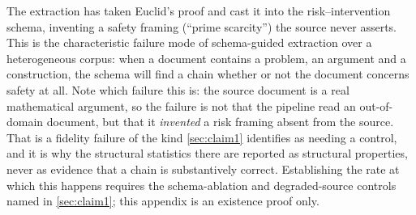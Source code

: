 \documentclass[10pt,twocolumn,letterpaper]{article}
\begin{document}
The extraction has taken Euclid's proof and cast it into the risk--intervention
schema, inventing a safety framing (``prime scarcity'') the source never asserts.
This is the characteristic failure mode of schema-guided extraction over a
heterogeneous corpus: when a document contains a problem, an argument and a
construction, the schema will find a chain whether or not the document concerns
safety at all. Note which failure this is: the source document is a real
mathematical argument, so the failure is not that the pipeline read an
out-of-domain document, but that it \emph{invented} a risk framing absent from
the source. That is a fidelity failure of the kind \cref{sec:claim1} identifies
as needing a control, and it is why the structural statistics there are reported
as structural properties, never as evidence that a chain is substantively
correct. Establishing the rate at which this happens requires the schema-ablation
and degraded-source controls named in \cref{sec:claim1}; this appendix is an
existence proof only.


\end{document}
